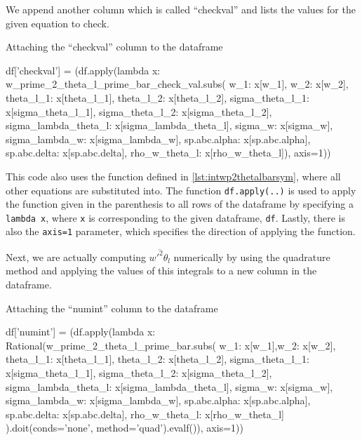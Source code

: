 \noindent
We append another column which is called \enquote{checkval} and lists the values for the given equation to check.
\begin{listing}[!ht]
    \caption{Attaching the \enquote{checkval} column to the dataframe}
    \label{lst:attachcheckvaltodataframe}
    \begin{pythoncode}
        df['checkval'] = (df.apply(lambda x: w_prime_2_theta_l_prime_bar_check_val.subs({
                 w_1: x[w_1], w_2: x[w_2], theta_l_1: x[theta_l_1], theta_l_2: x[theta_l_2],
                 sigma_theta_l_1: x[sigma_theta_l_1], sigma_theta_l_2: x[sigma_theta_l_2],
                 sigma_lambda_theta_l: x[sigma_lambda_theta_l], sigma_w: x[sigma_w],
                 sigma_lambda_w: x[sigma_lambda_w], sp.abc.alpha: x[sp.abc.alpha],
                 sp.abc.delta: x[sp.abc.delta], rho_w_theta_l: x[rho_w_theta_l]}), axis=1))
    \end{pythoncode}
\end{listing}

\noindent
This code also uses the function defined in \cref{lst:intwp2thetalbarsym}, where all other equations are substituted into.
The function \texttt{df.apply(..)} is used to apply the function given in the parenthesis to all rows of the dataframe by specifying a \texttt{lambda x}, where \texttt{x} is corresponding to the given dataframe, \texttt{df}.
Lastly, there is also the \texttt{axis=1} parameter, which specifies the direction of applying the function.

\noindent
Next, we are actually computing $\overline{w'^2\theta_l}$ numerically by using the quadrature method and applying the values of this integrals to a new column in the dataframe.
\begin{listing}[!ht]
    \caption{Attaching the \enquote{numint} column to the dataframe}
    \label{lst:attachnuminttodataframe}
    \begin{pythoncode}
        df['numint'] = (df.apply(lambda x: Rational(w_prime_2_theta_l_prime_bar.subs({
            w_1: x[w_1],w_2: x[w_2], theta_l_1: x[theta_l_1], theta_l_2: x[theta_l_2],
            sigma_theta_l_1: x[sigma_theta_l_1], sigma_theta_l_2: x[sigma_theta_l_2],
            sigma_lambda_theta_l: x[sigma_lambda_theta_l], sigma_w: x[sigma_w],
            sigma_lambda_w: x[sigma_lambda_w], sp.abc.alpha: x[sp.abc.alpha],
            sp.abc.delta: x[sp.abc.delta], rho_w_theta_l: x[rho_w_theta_l]
        }).doit(conds='none', method='quad').evalf()), axis=1))
    \end{pythoncode}
\end{listing}

